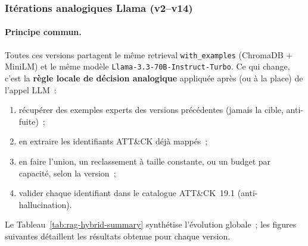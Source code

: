 \documentclass[a4paper,12pt]{article}
\begin{document}
\subsubsection{Itérations analogiques Llama (v2--v14)}

\paragraph{Principe commun.}
Toutes ces versions partagent le même retrieval
\texttt{with\_examples} (ChromaDB + MiniLM) et le même modèle
\texttt{Llama-3.3-70B-Instruct-Turbo}. Ce qui change, c'est la
\textbf{règle locale de décision analogique} appliquée après (ou à
la place) de l'appel LLM~:
\begin{enumerate}
    \item récupérer des exemples experts des versions précédentes
          (jamais la cible, anti-fuite)~;
    \item en extraire les identifiants ATT\&CK déjà mappés~;
    \item en faire l'union, un reclassement à taille constante, ou un
          budget par capacité, selon la version~;
    \item valider chaque identifiant dans le catalogue ATT\&CK~19.1
          (anti-hallucination).
\end{enumerate}
Le Tableau~\ref{tab:rag-hybrid-summary} synthétise l'évolution
globale~; les figures suivantes détaillent les résultats obtenue pour chaque version.
\end{document}
